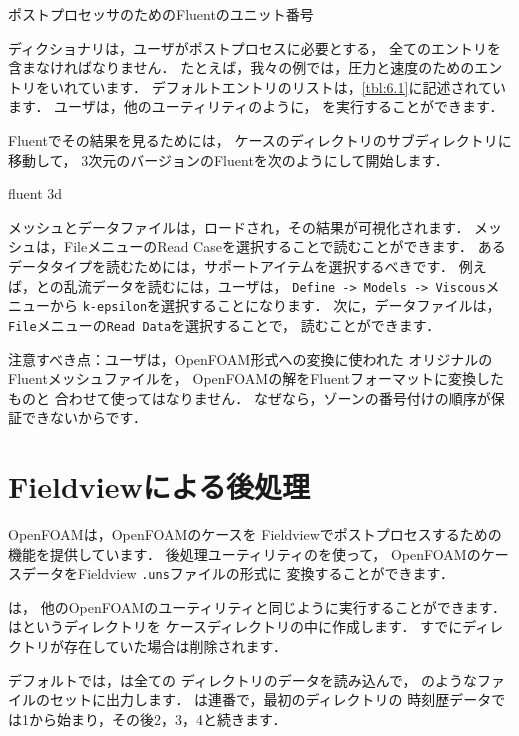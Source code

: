 \begin{table}[ht]
 
 \caption{ポストプロセッサのためのFluentのユニット番号}
 \label{tbl:6.1}
\end{table}


ディクショナリは，ユーザがポストプロセスに必要とする，
全てのエントリを含まなければなりません．
たとえば，我々の例では，圧力と速度のためのエントリをいれています．
デフォルトエントリのリストは，\autoref{tbl:6.1}に記述されています．
ユーザは，他のユーティリティのように，
を実行することができます．

Fluentでその結果を見るためには，
ケースのディレクトリのサブディレクトリに移動して，
3次元のバージョンのFluentを次のようにして開始します．
\begin{OFverbatim}[terminal]
fluent 3d
\end{OFverbatim}
メッシュとデータファイルは，ロードされ，その結果が可視化されます．
メッシュは，FileメニューのRead Caseを選択することで読むことができます．
あるデータタイプを読むためには，サポートアイテムを選択するべきです．
例えば，との乱流データを読むには，ユーザは，
\texttt{Define -> Models -> Viscous}メニューから
\texttt{k-epsilon}を選択することになります．
次に，データファイルは，\texttt{File}メニューの\texttt{Read Data}を選択することで，
読むことができます．

注意すべき点：ユーザは，OpenFOAM形式への変換に使われた
オリジナルのFluentメッシュファイルを，
OpenFOAMの解をFluentフォーマットに変換したものと
合わせて使ってはなりません．
なぜなら，ゾーンの番号付けの順序が保証できないからです．



\section{Fieldviewによる後処理}
\label{sec:6.3}
OpenFOAMは，OpenFOAMのケースを
Fieldviewでポストプロセスするための機能を提供しています．
後処理ユーティリティのを使って，
OpenFOAMのケースデータをFieldview \texttt{.uns}ファイルの形式に
変換することができます．

は，
他のOpenFOAMのユーティリティと同じように実行することができます．
はというディレクトリを
ケースディレクトリの中に作成します．
すでにディレクトリが存在していた場合は削除されます．

デフォルトでは，は全ての
ディレクトリのデータを読み込んで，
のようなファイルのセットに出力します．
は連番で，最初のディレクトリの
時刻歴データでは1から始まり，その後2，3，4と続きます．

